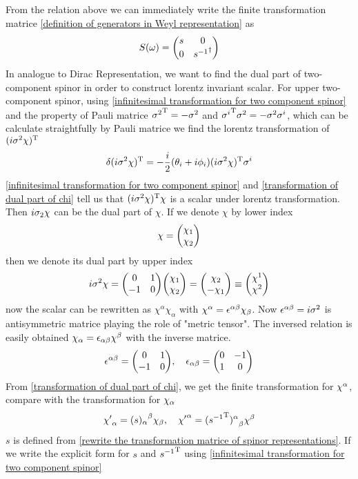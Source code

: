 From the relation above we can immediately write the finite transformation matrice \eqref{definition of generators in Weyl representation} as
\begin{equation}\label{rewrite the transformation matrice of spinor representations}
S(\w) = \mqty(
s &
0                           \\
0                           &
{s^{-1}}^{\dagger})
\end{equation}
In analogue to Dirac Representation, we want to find the dual part of two-component spinor in order to construct lorentz invariant scalar. For upper two-component spinor, using \eqref{infinitesimal transformation for two component spinor} and the property of Pauli matrice ${\sigma^{2}}^{\text{T}}=-\sigma^{2}$ and ${\sigma^{i}}^{\text{T}}\sigma^{2} = -\sigma^{2}\sigma^{i}$, which can be calculate straightfully by Pauli matrice
we find the lorentz transformation of $(i\sigma^2\chi)^{\text{T}}$ 
\begin{equation}\label{transformation of dual part of chi}
\delta{(i\sigma^2\chi)^{\text{T}}} 
=-\frac{i}{2} (\theta_i + i \phi_i)  (i\sigma^2 \chi)^{\text{T}} \sigma^{i}  
\end{equation}
\eqref{infinitesimal transformation for two component spinor} and \eqref{transformation of dual part of chi} tell us that
$(i\sigma^2\chi)^{\text{T}}\chi$ is a scalar under lorentz transformation. Then $i\sigma_2\chi$ can be the dual part of $\chi$.
If we denote $\chi$ by lower index
\begin{equation}
\chi = \mqty(\chi_1 \\ \chi_2)
\end{equation} 
then we denote its dual part by upper index
\begin{equation}
i\s^{2}\chi = \mqty(0 & 1 \\ -1 & 0)
\mqty(\chi_1 \\ \chi_2) 
=\mqty(\chi_2 \\ -\chi_1) 
\equiv \mqty(\chi^{1}\\\chi^{2})
\end{equation}
now the scalar can be rewritten as $\chi^{\alpha} \chi_{\alpha}$
with $\chi^{\alpha} =  \epsilon^{\alpha\beta}\chi_{\beta}$. Now $\epsilon^{\alpha\beta} =i\sigma^{2} $ is antisymmetric matrice playing the role of "metric tensor". The inversed relation is easily obtained $\chi_{\alpha} = \epsilon_{\alpha\beta}\chi^{\beta}$ with the inverse matrice.
\begin{equation}
\e^{\a\be} = \mqty(0 & 1 \\ -1 & 0),\quad
\e_{\a\be} =\mqty(0 & -1 \\ 1 & 0)
\end{equation}
From \eqref{transformation of dual part of chi}, we get the finite transformation for $\chi^{\alpha}$, compare with the transformation for $\chi_{\alpha}$
\begin{equation}\label{lorentz transformation for chi}
{\chi'}_{\alpha} = {(s)_{\alpha}}^{\beta}\chi_{\beta}
,\quad
{\chi'}^{\alpha} = {({s^{-1}}^{\text{T}})^{\alpha}}_{\beta}\chi^{\beta} 
\end{equation}
$s$ is defined from \eqref{rewrite the transformation matrice of spinor representations}. If we write the explicit form for $s$ and 
${s^{-1}}^{\text{T}}$ using \eqref{infinitesimal transformation for two component spinor}

